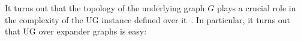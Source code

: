 It turns out that the topology of the underlying graph $G$ plays a crucial role in the complexity of the UG instance defined over it~\cite{AroraKKSTV08,MMlocalexpander,DBLP:journals/eccc/AroraIMS10}. In particular, it 
turns out that UG over expander graphs is easy:


